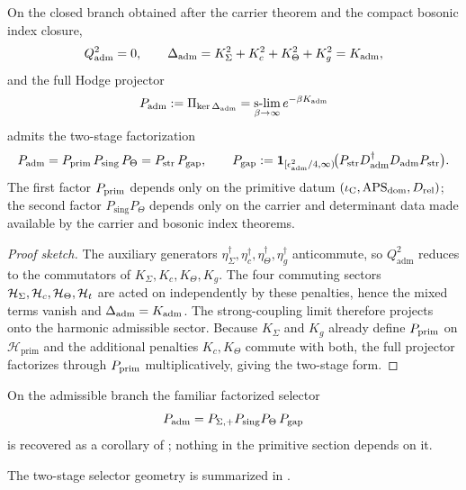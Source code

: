 \begin{theorem}
\label{thm:padm-upgrade}
On the closed branch obtained after the carrier theorem and the compact bosonic index closure,
\[
Q_{\mathrm{adm}}^2=0,
\qquad
\Delta_{\mathrm{adm}}=K_\Sigma^2+K_c^2+K_\Theta^2+K_g^2=K_{\mathrm{adm}},
\]
and the full Hodge projector
\[
P_{\mathrm{adm}}
:=
\Pi_{\ker\Delta_{\mathrm{adm}}}
=
\operatorname*{s-lim}_{\beta\to\infty}e^{-\beta K_{\mathrm{adm}}}
\]
admits the two-stage factorization
\[
P_{\mathrm{adm}}
=
P_{\mathrm{prim}}\,P_{\mathrm{sing}}\,P_\Theta
=
P_{\mathrm{str}}\,P_{\mathrm{gap}},
\qquad
P_{\mathrm{gap}}
:=
\mathbf 1_{[\epsilon_{\mathrm{adm}}^2/4,\infty)}\!\bigl(P_{\mathrm{str}}D_{\mathrm{adm}}^\dagger D_{\mathrm{adm}}P_{\mathrm{str}}\bigr).
\]
The first factor $P_{\mathrm{prim}}$ depends only on the primitive datum
$(\iota_{\mathrm C},\mathrm{APS}_{\mathrm{dom}},D_{\mathrm{rel}})$; the second factor $P_{\mathrm{sing}}P_\Theta$ depends only on
the carrier and determinant data made available by the carrier and bosonic index theorems.
\end{theorem}

\begin{proof}[Proof sketch]
The auxiliary generators $\eta_\Sigma^\dagger,\eta_c^\dagger,\eta_\Theta^\dagger,\eta_g^\dagger$
anticommute, so $Q_{\mathrm{adm}}^2$ reduces to the commutators of $K_\Sigma,K_c,K_\Theta,K_g$.
The four commuting sectors $\mathcal H_\Sigma,\mathcal H_c,\mathcal H_\Theta,\mathcal H_t$ are
acted on independently by these penalties, hence the mixed terms vanish and $\Delta_{\mathrm{adm}}=K_{\mathrm{adm}}$. The strong-coupling limit therefore projects onto the harmonic
admissible sector. Because $K_\Sigma$ and $K_g$ already define $P_{\mathrm{prim}}$ on
$\mathcal H_{\mathrm{prim}}$ and the additional penalties $K_c,K_\Theta$ commute with both, the
full projector factorizes through $P_{\mathrm{prim}}$ multiplicatively, giving the two-stage form.
\end{proof}

\begin{corollary}
\label{cor:factorized-admissibility-selector}
On the admissible branch the familiar factorized selector
\[
P_{\mathrm{adm}}=P_{\Sigma,+}P_{\mathrm{sing}}P_\Theta\,P_{\mathrm{gap}}
\]
is recovered as a corollary of ; nothing in the primitive section depends
on it.
\end{corollary}

The two-stage selector geometry is summarized in .

